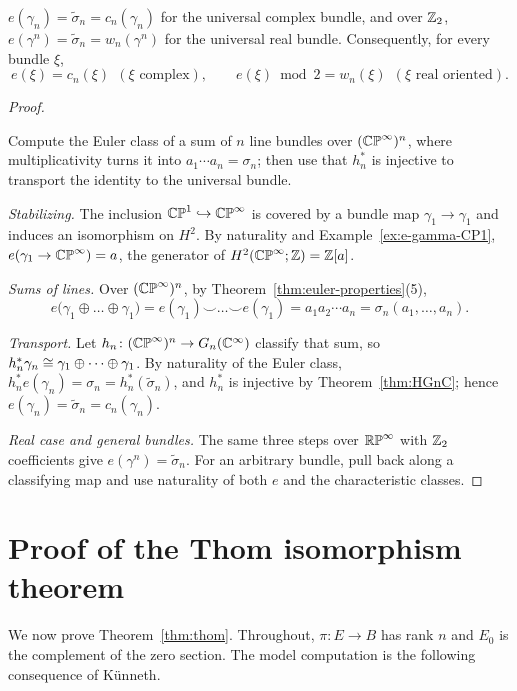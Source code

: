 \begin{theorem}\label{thm:e-gamma-n}
$e(\gamma_n)=\tilde\sigma_n=c_n(\gamma_n)$ for the universal complex bundle,
and over $\mathbb{Z}_2$, $e(\gamma^n)=\tilde\sigma_n=w_n(\gamma^n)$ for the universal
real bundle. Consequently, for every bundle $\xi$,
\[
e(\xi)=c_n(\xi)\ \ (\xi \text{ complex}),
\qquad
e(\xi)\bmod2=w_n(\xi)\ \ (\xi \text{ real oriented}).
\]
\end{theorem}

\begin{proof}
\begin{strategy}
Compute the Euler class of a sum of $n$ line bundles over $(\mathbb{CP}^\infty)^n$,
where multiplicativity turns it into $a_1\cdots a_n=\sigma_n$; then use that
$h_n^*$ is injective to transport the identity to the universal bundle.
\end{strategy}

 \emph{Stabilizing.} The inclusion $\mathbb{CP}^1\hookrightarrow\mathbb{CP}^\infty$ is
covered by a bundle map $\gamma_1\to\gamma_1$ and induces an isomorphism on
$H^2$. By naturality and Example~\ref{ex:e-gamma-CP1},
$e(\gamma_1\to\mathbb{CP}^\infty)=a$, the generator of $H^2(\mathbb{CP}^\infty;\mathbb{Z})=\mathbb{Z}[a]$.

 \emph{Sums of lines.} Over $(\mathbb{CP}^\infty)^n$, by
Theorem~\ref{thm:euler-properties}(5),
\[
e\big(\gamma_1\oplus\dots\oplus\gamma_1\big)
=e(\gamma_1)\smile\dots\smile e(\gamma_1)
=a_1a_2\cdots a_n=\sigma_n(a_1,\dots,a_n).
\]

 \emph{Transport.} Let $h_n\colon(\mathbb{CP}^\infty)^n\to G_n(\mathbb{C}^\infty)$
classify that sum, so $h_n^*\gamma_n\cong\gamma_1\oplus\dots\oplus\gamma_1$. By
naturality of the Euler class,
$h_n^*e(\gamma_n)=\sigma_n=h_n^*(\tilde\sigma_n)$, and $h_n^*$ is injective by
Theorem~\ref{thm:HGnC}; hence $e(\gamma_n)=\tilde\sigma_n=c_n(\gamma_n)$.

 \emph{Real case and general bundles.} The same three steps over
$\mathbb{RP}^\infty$ with $\mathbb{Z}_2$ coefficients give $e(\gamma^n)=\tilde\sigma_n$. For an
arbitrary bundle, pull back along a classifying map and use naturality of both
$e$ and the characteristic classes.
\end{proof}

\section{Proof of the Thom isomorphism theorem}

We now prove Theorem~\ref{thm:thom}. Throughout, $\pi\colon E\to B$ has rank $n$
and $E_0$ is the complement of the zero section. The model computation is the
following consequence of K\"unneth.

